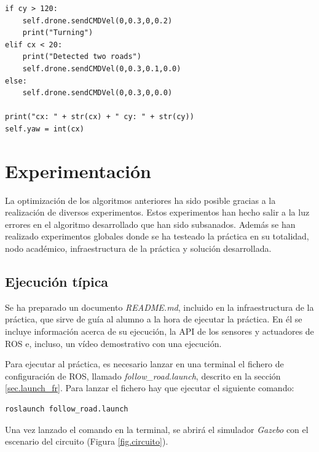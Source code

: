 \lstset{language=Python, breaklines=true, basicstyle=\footnotesize}
\begin{lstlisting}[frame=single]
if cy > 120:
    self.drone.sendCMDVel(0,0.3,0,0.2)
    print("Turning")
elif cx < 20:
    print("Detected two roads")
    self.drone.sendCMDVel(0,0.3,0.1,0.0)
else:
    self.drone.sendCMDVel(0,0.3,0,0.0)

print("cx: " + str(cx) + " cy: " + str(cy))
self.yaw = int(cx)
\end{lstlisting}

\section{Experimentación}
La optimización de los algoritmos anteriores ha sido posible gracias a la realización de
diversos experimentos. Estos experimentos han hecho salir a la luz errores en el algoritmo
desarrollado que han sido subsanados.
Además se han realizado experimentos globales donde se ha testeado la práctica en su
totalidad, nodo académico, infraestructura de la práctica y solución desarrollada.

\subsection{Ejecución típica}
Se ha preparado un documento \textit{README.md}, incluido en la infraestructura de la práctica, que sirve de guía al alumno a la hora de ejecutar la práctica. En él se incluye información acerca de su ejecución, la API de los sensores y actuadores de ROS e, incluso, un vídeo demostrativo con una ejecución.

Para ejecutar al práctica, es necesario lanzar en una terminal el fichero de configuración de ROS, llamado \textit{follow\_road.launch}, descrito en la sección \ref{sec.launch_fr}. Para lanzar el fichero hay que ejecutar el siguiente comando:

\lstset{language=bash, breaklines=true, basicstyle=\footnotesize}
\begin{lstlisting}[frame=single]
roslaunch follow_road.launch
\end{lstlisting}

Una vez lanzado el comando en la terminal, se abrirá el simulador \textit{Gazebo} con el escenario del circuito (Figura \ref{fig.circuito}).


